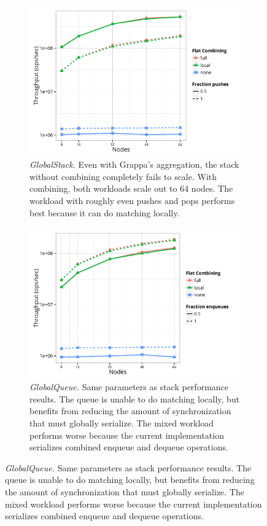 \begin{figure}[t]
  \centering
  \begin{subfigure}[b]{0.45\textwidth}
  \centering
  \includegraphics[width=\textwidth]{data/plots/stack_perf.pdf}
  \caption{\emph{GlobalStack.} Even with Grappa's aggregation, the stack without combining completely fails to scale. With combining, both workloads scale out to 64 nodes. The workload with roughly even pushes and pops performs best because it can do matching locally.}
  \label{fig:stack}
  \end{subfigure}%
  \hspace{0.05\textwidth}
  \begin{subfigure}[b]{0.45\textwidth}
  \centering
  \includegraphics[width=\textwidth]{data/plots/queue_perf.pdf}
  \caption{\emph{GlobalQueue.} Same parameters as stack performance results. The queue is unable to do matching locally, but benefits from reducing the amount of synchronization that must globally serialize. The mixed workload performs worse because the current implementation serializes combined enqueue and dequeue operations.}
  \label{fig:queue}
  \end{subfigure}
  

\end{figure}
